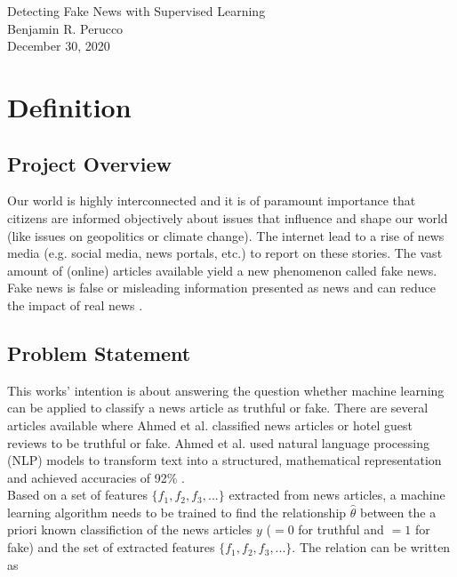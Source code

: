 \documentclass[a4paper,12pt,nottoc]{article}
\begin{document}
\begin{center}{\LARGE Detecting Fake News with Supervised Learning}\\\vspace{.5cm}Benjamin R. Perucco\\\vspace{.25cm}December 30, 2020\end{center}

\section{Definition}

\subsection{Project Overview}

Our world is highly interconnected and it is of paramount importance that citizens are informed objectively about issues that influence and shape our world (like issues on geopolitics or climate change). The internet lead to a rise of news media (e.g. social media, news portals, etc.) to report on these stories. The vast amount of (online) articles available yield a new phenomenon called fake news. Fake news is false or misleading information presented as news and can reduce the impact of real news \cite{bib:fakenews}. 

\subsection{Problem Statement}

This works' intention is about answering the question whether machine learning can be applied to classify a news article as truthful or fake. There are several articles available where Ahmed et al. classified news articles \cite{bib:ahmed-2017} or hotel guest reviews \cite{bib:ahmed-2018} to be truthful or fake. Ahmed et al. used natural language processing (NLP) models to transform text into a structured, mathematical representation and achieved accuracies of 92\% \cite{bib:ahmed-2017}.\\

\noindent Based on a set of features $\{f_{1}, f_{2}, f_{3}, ... \}$ extracted from news articles, a machine learning algorithm needs to be trained to find the relationship $\hat{\theta}$ between the a priori known classifiction of the news articles $y$ ($=0$ for truthful and $=1$ for fake) and the set of extracted features $\{f_{1}, f_{2}, f_{3}, ... \}$. The relation can be written as
\end{document}
